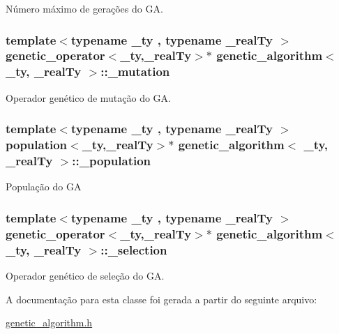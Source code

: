 \label{classgenetic__algorithm_aa27789d88ad571a15a9ad984f238f51e}
Número máximo de gerações do GA. \hypertarget{classgenetic__algorithm_a9f03558907645bff987053e1571c9816}{
\subsubsection[{\_\-mutation}]{\setlength{\rightskip}{0pt plus 5cm}template$<$typename \_\-ty , typename \_\-realTy $>$ {\bf genetic\_\-operator}$<$\_\-ty,\_\-realTy$>$$\ast$ {\bf genetic\_\-algorithm}$<$ \_\-ty, \_\-realTy $>$::{\bf \_\-mutation}}}
\label{classgenetic__algorithm_a9f03558907645bff987053e1571c9816}
Operador genético de mutação do GA. \hypertarget{classgenetic__algorithm_a1b2109867086541f375f091a34b1413b}{
\subsubsection[{\_\-population}]{\setlength{\rightskip}{0pt plus 5cm}template$<$typename \_\-ty , typename \_\-realTy $>$ {\bf population}$<$\_\-ty,\_\-realTy$>$$\ast$ {\bf genetic\_\-algorithm}$<$ \_\-ty, \_\-realTy $>$::{\bf \_\-population}}}
\label{classgenetic__algorithm_a1b2109867086541f375f091a34b1413b}
População do GA \hypertarget{classgenetic__algorithm_a237298e9294747b7531beca4df11e049}{
\subsubsection[{\_\-selection}]{\setlength{\rightskip}{0pt plus 5cm}template$<$typename \_\-ty , typename \_\-realTy $>$ {\bf genetic\_\-operator}$<$\_\-ty,\_\-realTy$>$$\ast$ {\bf genetic\_\-algorithm}$<$ \_\-ty, \_\-realTy $>$::{\bf \_\-selection}}}
\label{classgenetic__algorithm_a237298e9294747b7531beca4df11e049}
Operador genético de seleção do GA. 

A documentação para esta classe foi gerada a partir do seguinte arquivo:\begin{DoxyCompactItemize}
\item 
\hyperlink{genetic__algorithm_8h}{genetic\_\-algorithm.h}\end{DoxyCompactItemize}
